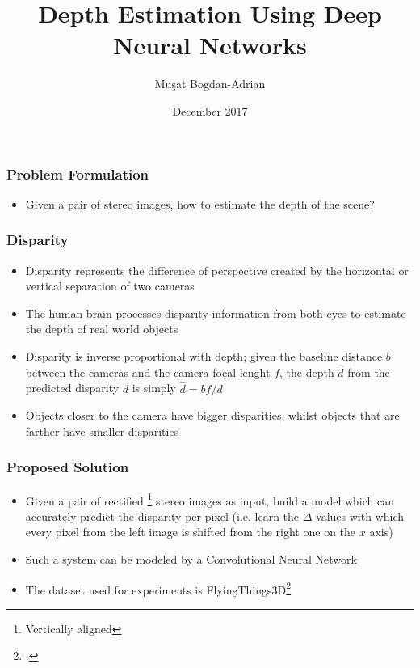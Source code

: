 \documentclass{beamer}
\title[Depth Estimation]{Depth Estimation Using Deep Neural Networks}
\author[Mu\c sat Bogdan-Adrian]{Mu\c sat Bogdan-Adrian}
\date{December 2017}
\begin{document}
\frame{\titlepage}

\begin{frame}
\frametitle{Problem Formulation}
\center
\begin{itemize}
	\item Given a pair of stereo images, how to estimate the depth of the scene?
\end{itemize}
\end{frame}

\begin{frame}
\frametitle{Disparity}
\center
\begin{itemize}
	\item Disparity represents the difference of perspective created by the horizontal or vertical separation of two cameras
	\item The human brain processes disparity information from both eyes to estimate the depth of real world objects
	\item Disparity is inverse proportional with depth; given the baseline distance \(b\) between the cameras and the camera focal lenght \(f\), the depth \(\hat{d}\) from the predicted disparity \(d\) is simply \(\hat{d}=bf/d\)
	\item Objects closer to the camera have bigger disparities, whilst objects that are farther have smaller disparities
\end{itemize}
\end{frame}

\begin{frame}
\frametitle{Proposed Solution}
\center
\begin{itemize}
	\item Given a pair of rectified \footnote{Vertically aligned} stereo images as input, build a model which can accurately predict the disparity per-pixel (i.e. learn the \(\Delta\) values with which every pixel from the left image is shifted from the right one on the \(x\) axis)
	\item Such a system can be modeled by a Convolutional Neural Network
	\item The dataset used for experiments is FlyingThings3D\footcite{MIFDB16}
\end{itemize}
\end{frame}
\end{document}
